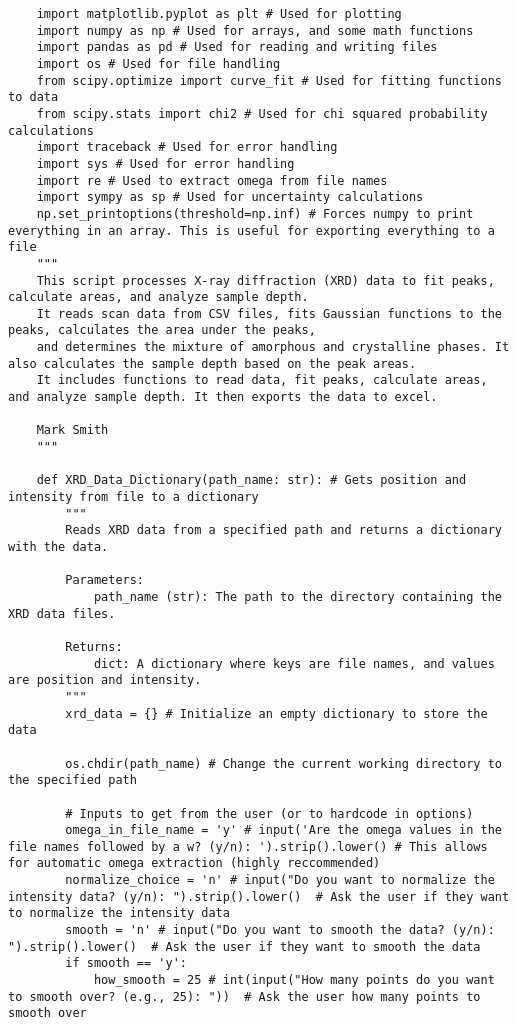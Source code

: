 \begin{lstlisting}
    import matplotlib.pyplot as plt # Used for plotting
    import numpy as np # Used for arrays, and some math functions
    import pandas as pd # Used for reading and writing files
    import os # Used for file handling
    from scipy.optimize import curve_fit # Used for fitting functions to data
    from scipy.stats import chi2 # Used for chi squared probability calculations
    import traceback # Used for error handling
    import sys # Used for error handling
    import re # Used to extract omega from file names
    import sympy as sp # Used for uncertainty calculations
    np.set_printoptions(threshold=np.inf) # Forces numpy to print everything in an array. This is useful for exporting everything to a file
    """
    This script processes X-ray diffraction (XRD) data to fit peaks, calculate areas, and analyze sample depth.
    It reads scan data from CSV files, fits Gaussian functions to the peaks, calculates the area under the peaks,
    and determines the mixture of amorphous and crystalline phases. It also calculates the sample depth based on the peak areas.
    It includes functions to read data, fit peaks, calculate areas, and analyze sample depth. It then exports the data to excel.

    Mark Smith
    """

    def XRD_Data_Dictionary(path_name: str): # Gets position and intensity from file to a dictionary
        """
        Reads XRD data from a specified path and returns a dictionary with the data.

        Parameters:
            path_name (str): The path to the directory containing the XRD data files.

        Returns:
            dict: A dictionary where keys are file names, and values are position and intensity.
        """
        xrd_data = {} # Initialize an empty dictionary to store the data

        os.chdir(path_name) # Change the current working directory to the specified path
        
        # Inputs to get from the user (or to hardcode in options)
        omega_in_file_name = 'y' # input('Are the omega values in the file names followed by a w? (y/n): ').strip().lower() # This allows for automatic omega extraction (highly reccommended)
        normalize_choice = 'n' # input("Do you want to normalize the intensity data? (y/n): ").strip().lower()  # Ask the user if they want to normalize the intensity data
        smooth = 'n' # input("Do you want to smooth the data? (y/n): ").strip().lower()  # Ask the user if they want to smooth the data
        if smooth == 'y':
            how_smooth = 25 # int(input("How many points do you want to smooth over? (e.g., 25): "))  # Ask the user how many points to smooth over
        

\end{lstlisting}
